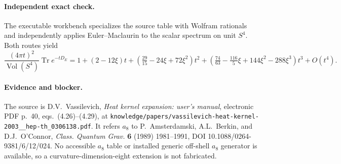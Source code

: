 \documentclass[11pt]{article}
\begin{document}
\paragraph{Independent exact check.} The executable workbench specializes the source table with Wolfram rationals and independently applies Euler--Maclaurin to the scalar spectrum on unit $S^4$. Both routes yield
\[
\frac{(4\pi t)^2}{\operatorname{Vol}(S^4)}\operatorname{Tr}e^{-tD_E}=1+(2-12\xi)t+(\tfrac{29}{15}-24\xi+72\xi^2)t^2+(\tfrac{74}{63}-\tfrac{116}{5}\xi+144\xi^2-288\xi^3)t^3+O(t^4).
\]
\paragraph{Evidence and blocker.} The source is D.V.~Vassilevich, \emph{Heat kernel expansion: user's manual}, electronic PDF p.~40, eqs.~(4.26)--(4.29), at \texttt{knowledge/papers/vassilevich-heat-kernel-2003\_\_hep-th\_0306138.pdf}. It refers $a_8$ to P.~Amsterdamski, A.L.~Berkin, and D.J.~O'Connor, \emph{Class. Quantum Grav.} \textbf{6} (1989) 1981--1991, DOI 10.1088/0264-9381/6/12/024. No accessible $a_8$ table or installed generic off-shell $a_8$ generator is available, so a curvature-dimension-eight extension is not fabricated.
\end{document}
